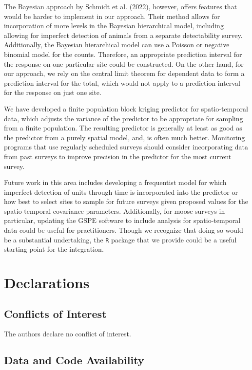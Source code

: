 \documentclass[]{article}    %
\begin{document}
The Bayesian approach by Schmidt et al. (2022), however, offers features
that would be harder to implement in our approach. Their method allows
for incorporation of more levels in the Bayesian hierarchical model,
including allowing for imperfect detection of animals from a separate
detectability survey. Additionally, the Bayesian hierarchical model can
use a Poisson or negative binomial model for the counts. Therefore, an
appropriate prediction interval for the response on one particular site
could be constructed. On the other hand, for our approach, we rely on
the central limit theorem for dependent data to form a prediction
interval for the total, which would not apply to a prediction interval
for the response on just one site.

We have developed a finite population block kriging predictor for
spatio-temporal data, which adjusts the variance of the predictor to be
appropriate for sampling from a finite population. The resulting
predictor is generally at least as good as the predictor from a purely
spatial model, and, is often much better. Monitoring programs that use
regularly scheduled surveys should consider incorporating data from past
surveys to improve precision in the predictor for the most current
survey.

Future work in this area includes developing a frequentist model for
which imperfect detection of units through time is incorporated into the
predictor or how best to select sites to sample for future surveys given
proposed values for the spatio-temporal covariance parameters.
Additionally, for moose surveys in particular, updating the GSPE
software to include analysis for spatio-temporal data could be useful
for practitioners. Though we recognize that doing so would be a
substantial undertaking, the \texttt{R} package that we provide could be
a useful starting point for the integration.

\hypertarget{declarations}{%
\section{Declarations}\label{declarations}}

\hypertarget{conflicts}{%
\subsection*{Conflicts of Interest}\label{conflicts}}

The authors declare no conflict of interest.

\hypertarget{data-and-code-availability}{%
\subsection*{Data and Code Availability}\label{data-and-code-availability}}
\end{document}
